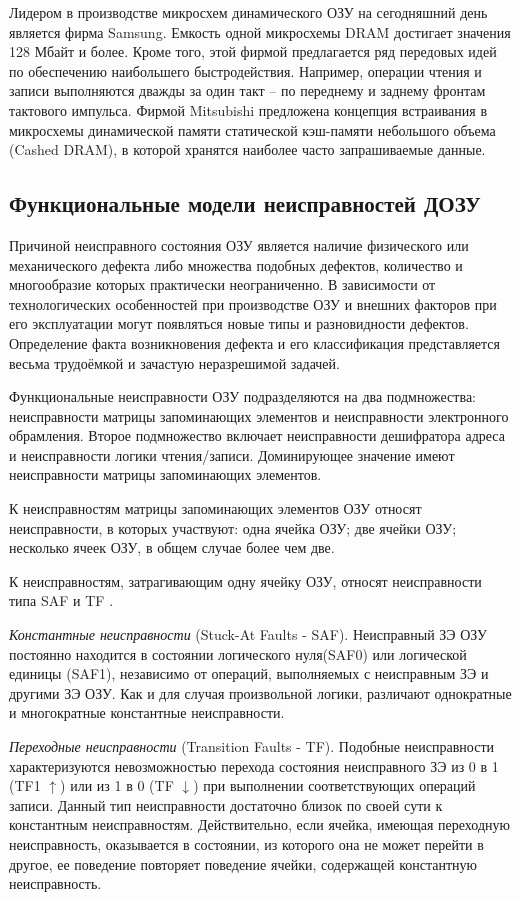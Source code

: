 Лидером в производстве микросхем динамического ОЗУ на сегодняшний день является фирма Samsung. Емкость одной микросхемы DRAM достигает значения 128 Мбайт и более. Кроме того, этой фирмой предлагается ряд передовых идей по обеспечению наибольшего быстродействия. Например, операции чтения и записи выполняются дважды за один такт – по переднему и заднему фронтам тактового импульса. Фирмой Mitsubishi предложена концепция встраивания в микросхемы динамической памяти статической кэш-памяти небольшого объема (Cashed DRAM), в которой хранятся наиболее часто запрашиваемые данные.

\subsection{Функциональные модели неисправностей ДОЗУ}
\label{sub:domain:faults}
Причиной неисправного состояния ОЗУ является наличие физического или механического дефекта либо множества подобных дефектов, количество и многообразие которых практически неограниченно. В зависимости от технологических особенностей при производстве ОЗУ и внешних факторов при его эксплуатации могут появляться новые типы и разновидности дефектов. Определение факта возникновения дефекта и его классификация представляется весьма трудоёмкой и зачастую неразрешимой задачей. 

Функциональные неисправности ОЗУ подразделяются на два подмножества: неисправности матрицы запоминающих элементов и неисправности электронного обрамления. Второе подмножество включает неисправности дешифратора адреса и неисправности логики чтения/записи. Доминирующее значение имеют неисправности матрицы запоминающих элементов.

К неисправностям матрицы запоминающих элементов ОЗУ относят неисправности, в которых участвуют: одна ячейка ОЗУ; две ячейки ОЗУ; несколько ячеек ОЗУ, в общем случае более чем две. 

К неисправностям, затрагивающим одну ячейку ОЗУ, относят неисправности типа SAF и TF \cite{faults}.

\textit{Константные неисправности} (Stuck-At Faults - SAF). Неисправный ЗЭ ОЗУ постоянно находится в состоянии логического нуля(SAF0) или логической единицы (SAF1), независимо от операций, выполняемых с неисправным ЗЭ и другими ЗЭ ОЗУ. Как и для случая произвольной логики, различают однократные и многократные константные неисправности.

\textit{Переходные неисправности} (Transition Faults - TF). Подобные неисправности характеризуются невозможностью перехода состояния неисправного ЗЭ из 0 в 1 (TF1 $\uparrow$) или из 1 в 0 (TF $\downarrow$) при выполнении соответствующих операций записи. Данный тип неисправности достаточно близок по своей сути к константным неисправностям. Действительно, если ячейка, имеющая переходную неисправность, оказывается в состоянии, из которого она не может перейти в другое, ее поведение повторяет поведение ячейки, содержащей константную неисправность.

